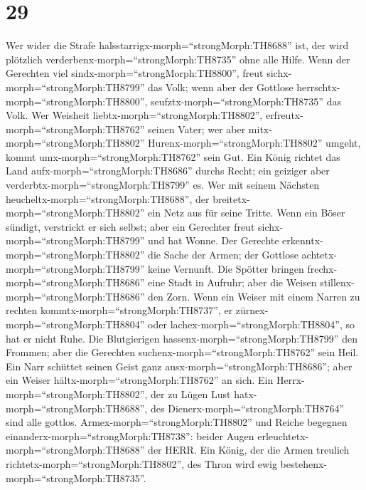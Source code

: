 \hypertarget{section-28}{%
\section{29}\label{section-28}}

 Wer wider die Strafe
halsstarrigx-morph=``strongMorph:TH8688'' ist, der wird plötzlich
verderbenx-morph=``strongMorph:TH8735'' ohne alle Hilfe. 
Wenn der Gerechten viel sindx-morph=``strongMorph:TH8800'', freut
sichx-morph=``strongMorph:TH8799'' das Volk; wenn aber der Gottlose
herrschtx-morph=``strongMorph:TH8800'',
seufztx-morph=``strongMorph:TH8735'' das Volk.  Wer Weisheit
liebtx-morph=``strongMorph:TH8802'',
erfreutx-morph=``strongMorph:TH8762'' seinen Vater; wer aber
mitx-morph=``strongMorph:TH8802'' Hurenx-morph=``strongMorph:TH8802''
umgeht, kommt umx-morph=``strongMorph:TH8762'' sein Gut. 
Ein König richtet das Land aufx-morph=``strongMorph:TH8686'' durchs
Recht; ein geiziger aber verderbtx-morph=``strongMorph:TH8799'' es.
 Wer mit seinem Nächsten
heucheltx-morph=``strongMorph:TH8688'', der
breitetx-morph=``strongMorph:TH8802'' ein Netz aus für seine Tritte.
 Wenn ein Böser sündigt, verstrickt er sich selbst; aber ein
Gerechter freut sichx-morph=``strongMorph:TH8799'' und hat Wonne.
 Der Gerechte erkenntx-morph=``strongMorph:TH8802'' die
Sache der Armen; der Gottlose achtetx-morph=``strongMorph:TH8799'' keine
Vernunft.  Die Spötter bringen
frechx-morph=``strongMorph:TH8686'' eine Stadt in Aufruhr; aber die
Weisen stillenx-morph=``strongMorph:TH8686'' den Zorn.  Wenn
ein Weiser mit einem Narren zu rechten
kommtx-morph=``strongMorph:TH8737'', er
zürnex-morph=``strongMorph:TH8804'' oder
lachex-morph=``strongMorph:TH8804'', so hat er nicht Ruhe. 
Die Blutgierigen hassenx-morph=``strongMorph:TH8799'' den Frommen; aber
die Gerechten suchenx-morph=``strongMorph:TH8762'' sein Heil.
 Ein Narr schüttet seinen Geist ganz
ausx-morph=``strongMorph:TH8686''; aber ein Weiser
hältx-morph=``strongMorph:TH8762'' an sich.  Ein
Herrx-morph=``strongMorph:TH8802'', der zu Lügen Lust
hatx-morph=``strongMorph:TH8688'', des
Dienerx-morph=``strongMorph:TH8764'' sind alle gottlos. 
Armex-morph=``strongMorph:TH8802'' und Reiche begegnen
einanderx-morph=``strongMorph:TH8738'': beider Augen
erleuchtetx-morph=``strongMorph:TH8688'' der HERR.  Ein
König, der die Armen treulich richtetx-morph=``strongMorph:TH8802'', des
Thron wird ewig bestehenx-morph=``strongMorph:TH8735''. 
